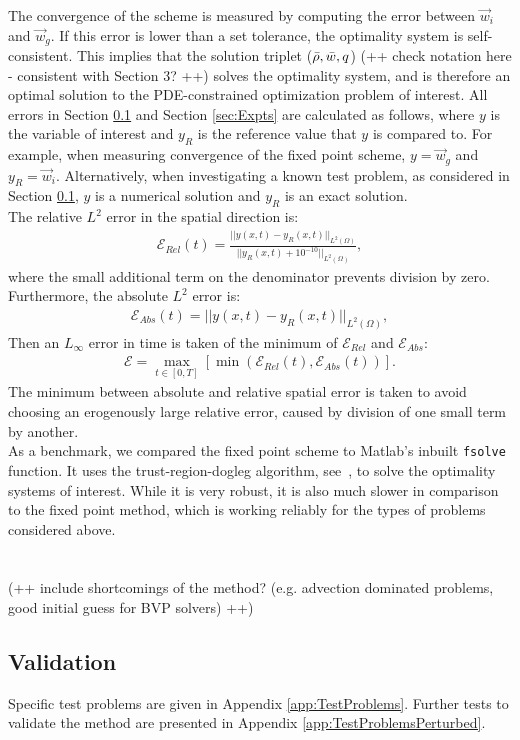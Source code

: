 The convergence of the scheme is measured by computing the error between $\vec{w}_{i}$ and $\vec{w}_{g}$. If this error is lower than a set tolerance, the optimality system is self-consistent. This implies that the solution triplet ($\bar{\rho},\bar{{w}},q$) (++ check notation here - consistent with Section 3? ++) solves the optimality system, and is therefore an optimal solution to the PDE-constrained optimization problem of interest.
All errors in Section \ref{sec:Method_Validation} and Section \ref{sec:Expts} are calculated as follows, where $y$ is the variable of interest and $y_R$ is the reference value that $y$ is compared to. For example, when measuring convergence of the fixed point scheme, $y = \vec{w}_g$ and $y_R = \vec{w}_i$. Alternatively, when investigating a known test problem, as considered in Section \ref{sec:Method_Validation}, $y$ is a numerical solution and $y_R$ is an exact solution.\\ 
The relative $L^2$ error in the spatial direction is:
\begin{align*}
\mathcal{E}_{Rel}(t) = \frac{|| y(x,t) - y_{R}(x,t)||_{L^2(\Omega)} }{||y_R(x,t) + 10^{-10}||_{L^2(\Omega)}},
\end{align*}
where the small additional term on the denominator prevents division by zero.
Furthermore, the absolute $L^2$ error is:
\begin{align*}
\mathcal{E}_{Abs}(t) = || y(x,t) - y_R(x,t)||_{L^2(\Omega)} ,
\end{align*}
Then an $L_\infty$ error in time is taken of the minimum of $\mathcal{E}_{Rel}$ and $\mathcal{E}_{Abs}$:
\begin{align*}
\mathcal{E} = \max_{t \in [0,T]}\left[\min\left(\mathcal{E}_{Rel}(t), \mathcal{E}_{Abs}(t)\right)\right].
\end{align*}
The minimum between absolute and relative spatial error is taken to avoid choosing an erogenously large relative error, caused by division of one small term by another.
\\
As a benchmark, we compared the fixed point scheme to Matlab's inbuilt \texttt{fsolve} function. It uses the trust-region-dogleg algorithm, see~\cite{Powell1}, to solve the optimality systems of interest. While it is very robust, it is also much slower in comparison to the fixed point method, which is working reliably for the types of problems considered above.
\\
\\
\\
(++ include shortcomings of the method? (e.g. advection dominated problems, good initial guess for BVP solvers) ++)





\subsection{Validation}\label{sec:Method_Validation}

Specific test problems are given in Appendix \ref{app:TestProblems}. 
Further tests to validate the method are presented in Appendix \ref{app:TestProblemsPerturbed}.
